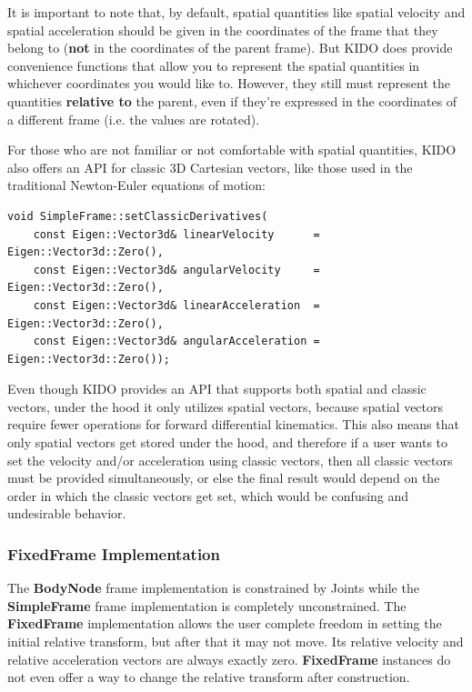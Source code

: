 It is important to note that, by default, spatial quantities like spatial velocity and spatial acceleration should be given in the coordinates of the frame that they belong to (\textbf{not} in the coordinates of the parent frame). But KIDO does provide convenience functions that allow you to represent the spatial quantities in whichever coordinates you would like to. However, they still must represent the quantities \textbf{relative to} the parent, even if they're expressed in the coordinates of a different frame (i.e. the values are rotated).

For those who are not familiar or not comfortable with spatial quantities, KIDO also offers an API for classic 3D Cartesian vectors, like those used in the traditional Newton-Euler equations of motion:

\begin{lstlisting}
void SimpleFrame::setClassicDerivatives(
    const Eigen::Vector3d& linearVelocity      = Eigen::Vector3d::Zero(),
    const Eigen::Vector3d& angularVelocity     = Eigen::Vector3d::Zero(),
    const Eigen::Vector3d& linearAcceleration  = Eigen::Vector3d::Zero(),
    const Eigen::Vector3d& angularAcceleration = Eigen::Vector3d::Zero());
\end{lstlisting}

Even though KIDO provides an API that supports both spatial and classic vectors, under the hood it only utilizes spatial vectors, because spatial vectors require fewer operations for forward differential kinematics. This also means that only spatial vectors get stored under the hood, and therefore if a user wants to set the velocity and/or acceleration using classic vectors, then all classic vectors must be provided simultaneously, or else the final result would depend on the order in which the classic vectors get set, which would be confusing and undesirable behavior.

\subsubsection{FixedFrame Implementation}

The \textbf{BodyNode} frame implementation is constrained by Joints while the \textbf{SimpleFrame} frame implementation is completely unconstrained. The \textbf{FixedFrame} implementation allows the user complete freedom in setting the initial relative transform, but after that it may not move. Its relative velocity and relative acceleration vectors are always exactly zero. \textbf{FixedFrame} instances do not even offer a way to change the relative transform after construction.

